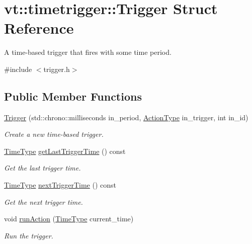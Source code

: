 \hypertarget{structvt_1_1timetrigger_1_1_trigger}{}\section{vt\+:\+:timetrigger\+:\+:Trigger Struct Reference}
\label{structvt_1_1timetrigger_1_1_trigger}


A time-\/based trigger that fires with some time period.  




{\ttfamily \#include $<$trigger.\+h$>$}

\subsection*{Public Member Functions}
\begin{DoxyCompactItemize}
\item 
\hyperlink{structvt_1_1timetrigger_1_1_trigger_aa457c370c31674979005504c703e2df4}{Trigger} (std\+::chrono\+::milliseconds in\+\_\+period, \hyperlink{namespacevt_ae0a5a7b18cc99d7b732cb4d44f46b0f3}{Action\+Type} in\+\_\+trigger, int in\+\_\+id)
\begin{DoxyCompactList}\small\item\em Create a new time-\/based trigger. \end{DoxyCompactList}\item 
\hyperlink{namespacevt_a2b9f28078dc309ad0706b69ded743e69}{Time\+Type} \hyperlink{structvt_1_1timetrigger_1_1_trigger_a4065ece0b3f17ee3780b045e3520aaf5}{get\+Last\+Trigger\+Time} () const
\begin{DoxyCompactList}\small\item\em Get the last trigger time. \end{DoxyCompactList}\item 
\hyperlink{namespacevt_a2b9f28078dc309ad0706b69ded743e69}{Time\+Type} \hyperlink{structvt_1_1timetrigger_1_1_trigger_a77c78026bc618f6084ecda2a3e0198ba}{next\+Trigger\+Time} () const
\begin{DoxyCompactList}\small\item\em Get the next trigger time. \end{DoxyCompactList}\item 
void \hyperlink{structvt_1_1timetrigger_1_1_trigger_a44688f64be94b9c821768b55a3a236f7}{run\+Action} (\hyperlink{namespacevt_a2b9f28078dc309ad0706b69ded743e69}{Time\+Type} current\+\_\+time)
\begin{DoxyCompactList}\small\item\em Run the trigger. \end{DoxyCompactList}\item 

\end{DoxyCompactItemize}
